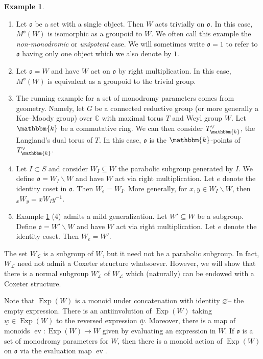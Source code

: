 \documentclass{amsart}
\newcommand{\C}{\mathbb{C}}
\renewcommand{\k}{\mathbbm{k}}
\newcommand{\scrL}{\mathcal{L}}
\newcommand{\fr}[1]{\mathfrak{#1}}
\DeclareMathOperator{\ev}{ev}
\DeclareMathOperator{\Exp}{Exp}
\newcommand{\W}[2]{{}_{#1}W_{#2}}
\newcommand{\uw}{\underline{w}}
\renewcommand{\emptyset}{\varnothing}
\theoremstyle{definition}
\newtheorem{example}[subsubsection]{Example}
\numberwithin{equation}{subsection}
\begin{document}
\begin{example}\label{ex:mon_params}
    \begin{enumerate}
        \item Let $\fr{o}$ be a set with a single object. Then $W$ acts trivially on $\fr{o}$. In this case, $M^{\fr{o}} (W)$ is isomorphic as a groupoid to $W$. We often call this example the \emph{non-monodromic} or \emph{unipotent} case. 
        We will sometimes write $\fr{o} = 1$ to refer to $\fr{o}$ having only one object which we also denote by $1$. 
        \item Let $\fr{o} = W$ and have $W$ act on $\fr{o}$ by right multiplication. In this case, $M^{\fr{o}} (W)$ is equivalent as a groupoid to the trivial group.
        \item The running example for a set of monodromy parameters comes from geometry. Namely, let $G$ be a connected reductive group (or more generally a Kac--Moody group) over $\C$ with maximal torus $T$ and Weyl group $W$.
        Let $\k$ be a commutative ring. We can then consider $T_{\k}^{\vee}$, the Langland's dual torus of $T$.
        In this case, $\fr{o}$ is the $\k$-points of $T_{\k}^{\vee}$.
        \item Let $I \subset S$ and consider $W_I \subseteq W$ the parabolic subgroup generated by $I$. We define $\fr{o} = W_I \backslash W$ and have $W$ act via right multiplication.
        Let $e$ denote the identity coset in $\fr{o}$. Then $W_e = W_I$. More generally, for $x,y \in W_I \backslash W$, then $\W{x}{y} = xW_I y^{-1}$. 
        \item Example \ref{ex:mon_params} (4) admits a mild generalization. Let $W' \subseteq W$ be a subgroup. Define $\fr{o} = W' \backslash W$ and have $W$ act via right multiplication.
        Let $e$ denote the identity coset. Then $W_e = W'$.
    \end{enumerate}
\end{example}

The set $W_{\scrL}$ is a subgroup of $W$, but it need not be a parabolic subgroup. In fact, $W_{\scrL}$ need not admit a Coxeter structure whatsoever.
However, we will show that there is a normal subgroup $W_{\scrL}^{\circ}$ of $W_{\scrL}$ which (naturally) can be endowed with a Coxeter structure.

Note that $\Exp (W)$ is a monoid under concatenation with identity $\emptyset$-- the empty expression.
There is an antiinvolution of $\Exp (W)$ taking $\uw \in \Exp (W)$ to the reversed expression $\overline{\uw}$.
Moreover, there is a map of monoids $\ev : \Exp (W) \to W$ given by evaluating an expression in $W$.
If $\fr{o}$ is a set of monodromy parameters for $W$, then there is a monoid action of $\Exp (W)$ on $\fr{o}$ via the evaluation map $\ev$.
\end{document}
